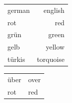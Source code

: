

\begin{center}
  \begin{tabular}{lr}
    german & english \\
    rot & red \\
    grün & green \\
    gelb & yellow \\
    türkis & torquoise \\
  \end{tabular}
\end{center}

\begin{center}
  \begin{tabular}{ll}
    über & over \\ rot & red \\
  \end{tabular}
\end{center}



